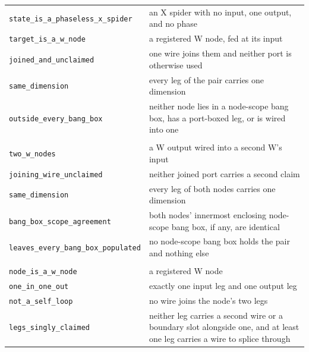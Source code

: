 \begin{xltabular}{\textwidth}{@{}>{\raggedright\arraybackslash}p{0.42\textwidth}>{\raggedright\arraybackslash}X@{}}
\quad\texttt{state\_\allowbreak{}is\_\allowbreak{}a\_\allowbreak{}phaseless\_\allowbreak{}x\_\allowbreak{}spider} & an X spider with no input, one output, and no phase \\
\quad\texttt{target\_\allowbreak{}is\_\allowbreak{}a\_\allowbreak{}w\_\allowbreak{}node} & a registered W node, fed at its input \\
\quad\texttt{joined\_\allowbreak{}and\_\allowbreak{}unclaimed} & one wire joins them and neither port is otherwise used \\
\quad\texttt{same\_\allowbreak{}dimension} & every leg of the pair carries one dimension \\
\quad\texttt{outside\_\allowbreak{}every\_\allowbreak{}bang\_\allowbreak{}box} & neither node lies in a node-scope bang box, has a port-boxed leg, or is wired into one \\
\midrule
{}\\
\quad\texttt{two\_\allowbreak{}w\_\allowbreak{}nodes} & a W output wired into a second W's input \\
\quad\texttt{joining\_\allowbreak{}wire\_\allowbreak{}unclaimed} & neither joined port carries a second claim \\
\quad\texttt{same\_\allowbreak{}dimension} & every leg of both nodes carries one dimension \\
\quad\texttt{bang\_\allowbreak{}box\_\allowbreak{}scope\_\allowbreak{}agreement} & both nodes' innermost enclosing node-scope bang box, if any, are identical \\
\quad\texttt{leaves\_\allowbreak{}every\_\allowbreak{}bang\_\allowbreak{}box\_\allowbreak{}populated} & no node-scope bang box holds the pair and nothing else \\
\midrule
{}\\
\quad\texttt{node\_\allowbreak{}is\_\allowbreak{}a\_\allowbreak{}w\_\allowbreak{}node} & a registered W node \\
\quad\texttt{one\_\allowbreak{}in\_\allowbreak{}one\_\allowbreak{}out} & exactly one input leg and one output leg \\
\quad\texttt{not\_\allowbreak{}a\_\allowbreak{}self\_\allowbreak{}loop} & no wire joins the node's two legs \\
\quad\texttt{legs\_\allowbreak{}singly\_\allowbreak{}claimed} & neither leg carries a second wire or a boundary slot alongside one, and at least one leg carries a wire to splice through \\

\end{xltabular}
